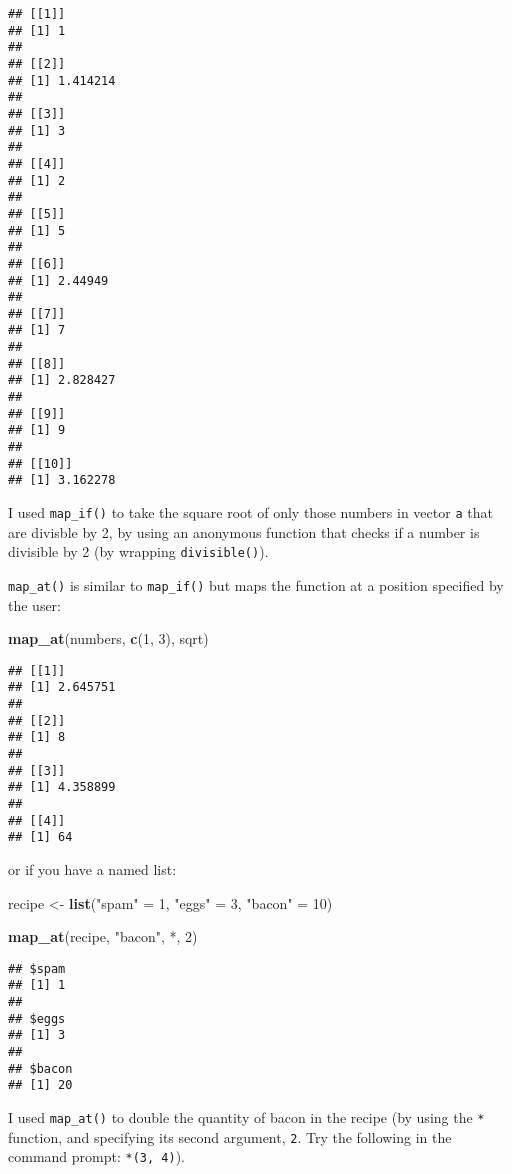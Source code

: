 \documentclass[
]{article}
\newenvironment{Shaded}{\begin{snugshade}}{\end{snugshade}}
\newcommand{\DataTypeTok}[1]{\textcolor[rgb]{0.13,0.29,0.53}{#1}}
\newcommand{\DecValTok}[1]{\textcolor[rgb]{0.00,0.00,0.81}{#1}}
\newcommand{\KeywordTok}[1]{\textcolor[rgb]{0.13,0.29,0.53}{\textbf{#1}}}
\newcommand{\NormalTok}[1]{#1}
\newcommand{\StringTok}[1]{\textcolor[rgb]{0.31,0.60,0.02}{#1}}
\begin{document}
\begin{verbatim}
## [[1]]
## [1] 1
## 
## [[2]]
## [1] 1.414214
## 
## [[3]]
## [1] 3
## 
## [[4]]
## [1] 2
## 
## [[5]]
## [1] 5
## 
## [[6]]
## [1] 2.44949
## 
## [[7]]
## [1] 7
## 
## [[8]]
## [1] 2.828427
## 
## [[9]]
## [1] 9
## 
## [[10]]
## [1] 3.162278
\end{verbatim}

I used \texttt{map\_if()} to take the square root of only those numbers in vector \texttt{a} that are divisble by 2,
by using an anonymous function that checks if a number is divisible by 2 (by wrapping \texttt{divisible()}).

\texttt{map\_at()} is similar to \texttt{map\_if()} but maps the function at a position specified by the user:

\begin{Shaded}
\begin{Highlighting}[]
\KeywordTok{map\_at}\NormalTok{(numbers, }\KeywordTok{c}\NormalTok{(}\DecValTok{1}\NormalTok{, }\DecValTok{3}\NormalTok{), sqrt)}
\end{Highlighting}
\end{Shaded}

\begin{verbatim}
## [[1]]
## [1] 2.645751
## 
## [[2]]
## [1] 8
## 
## [[3]]
## [1] 4.358899
## 
## [[4]]
## [1] 64
\end{verbatim}

or if you have a named list:

\begin{Shaded}
\begin{Highlighting}[]
\NormalTok{recipe \textless{}{-}}\StringTok{ }\KeywordTok{list}\NormalTok{(}\StringTok{"spam"}\NormalTok{ =}\StringTok{ }\DecValTok{1}\NormalTok{, }\StringTok{"eggs"}\NormalTok{ =}\StringTok{ }\DecValTok{3}\NormalTok{, }\StringTok{"bacon"}\NormalTok{ =}\StringTok{ }\DecValTok{10}\NormalTok{)}

\KeywordTok{map\_at}\NormalTok{(recipe, }\StringTok{"bacon"}\NormalTok{, }\StringTok{\textasciigrave{}}\DataTypeTok{*}\StringTok{\textasciigrave{}}\NormalTok{, }\DecValTok{2}\NormalTok{)}
\end{Highlighting}
\end{Shaded}

\begin{verbatim}
## $spam
## [1] 1
## 
## $eggs
## [1] 3
## 
## $bacon
## [1] 20
\end{verbatim}

I used \texttt{map\_at()} to double the quantity of bacon in the recipe (by using the \texttt{*} function, and specifying
its second argument, \texttt{2}. Try the following in the command prompt: \texttt{\textasciigrave{}*\textasciigrave{}(3,\ 4)}).
\end{document}
